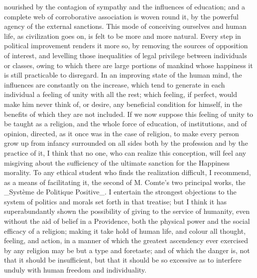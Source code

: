 \documentclass[12pt]{article}
\begin{document}
nourished by the contagion of sympathy and the influences of education; and a complete web of corroborative association is woven round it, by the powerful agency of the external sanctions. This mode of conceiving ourselves and human life, as civilization goes on, is felt to be more and more natural. Every step in political improvement renders it more so, by removing the sources of opposition of interest, and levelling those inequalities of legal privilege between individuals or classes, owing to which there are large portions of mankind whose happiness it is still practicable to disregard. In an improving state of the human mind, the influences are constantly on the increase, which tend to generate in each individual a feeling of unity with all the rest; which feeling, if perfect, would make him never think of, or desire, any beneficial condition for himself, in the benefits of which they are not included. If we now suppose this feeling of unity to be taught as a religion, and the whole force of education, of institutions, and of opinion, directed, as it once was in the case of religion, to make every person grow up from infancy surrounded on all sides both by the profession and by the practice of it, I think that no one, who can realize this conception, will feel any misgiving about the sufficiency of the ultimate sanction for the Happiness morality. To any ethical student who finds the realization difficult, I recommend, as a means of facilitating it, the second of M. Comte's two principal works, the \_Système de Politique Positive\_. I entertain the strongest objections to the system of politics and morals set forth in that treatise; but I think it has superabundantly shown the possibility of giving to the service of humanity, even without the aid of belief in a Providence, both the physical power and the social efficacy of a religion; making it take hold of human life, and colour all thought, feeling, and action, in a manner of which the greatest ascendency ever exercised by any religion may be but a type and foretaste; and of which the danger is, not that it should be insufficient, but that it should be so excessive as to interfere unduly with human freedom and individuality.
\end{document}
